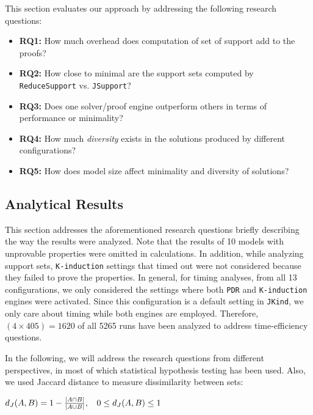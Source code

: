 This section evaluates our approach by addressing the following research questions:

\begin{itemize}
    \item \textbf{RQ1:} How much overhead does computation of set of support add to the proofs?
    \item \textbf{RQ2:} How close to minimal are the support sets computed by \texttt{ReduceSupport} vs. \texttt{JSupport}?
    \item \textbf{RQ3:} Does one solver/proof engine outperform others in terms of performance or minimality?
    \item \textbf{RQ4:} How much {\em diversity} exists in the solutions produced by different configurations?
    \item \textbf{RQ5:} How does model size affect minimality and diversity of solutions?
\end{itemize}

\subsection{Analytical Results}
\label{sec:res}
This section addresses the aforementioned research questions briefly describing the way the results were analyzed. Note that the results of 10 models with unprovable properties were omitted in calculations. In addition, while analyzing support sets, \texttt{K-induction} settings that timed out were not considered because they failed to prove the properties.
In general, for timing analyses, from all 13 configurations, we only considered the settings where both \texttt{PDR} and \texttt{K-induction} engines were activated. Since this configuration is a default setting in \texttt{JKind}, we only care about timing while both engines are employed. Therefore, $(4 \times 405) = 1620$ of all 5265 runs have been analyzed to address time-efficiency questions.

In the following, we will address the research questions from different perspectives, in most of which statistical hypothesis testing \cite{lehmann1986testing} has been used. Also, we used Jaccard distance to measure dissimilarity between sets:

\begin{center}
$d_J(\small{A}, \small{B}) = 1 - \frac{|A \cap B|}{|A \cup B|} ,\hspace{9pt} 0 \leq d_J(\small{A}, \small{B}) \leq 1$
\end{center}

